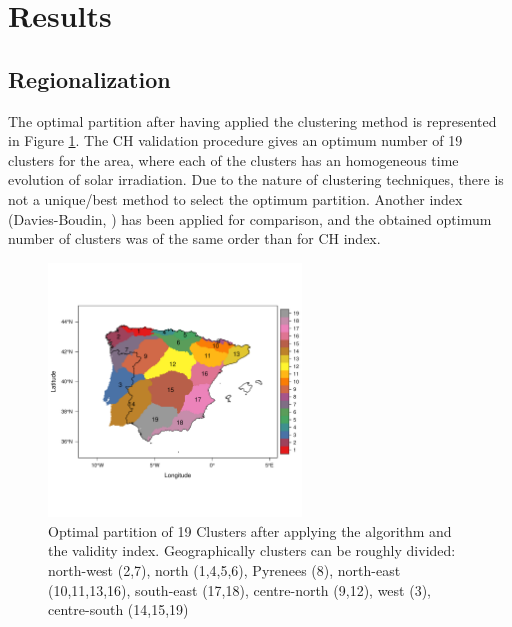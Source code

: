  

\section{Results}

\subsection{Regionalization}

The optimal partition after having applied the clustering method is represented in Figure \ref{clusters}. The CH validation procedure gives an optimum number of 19 clusters for the area, where each of the clusters has an homogeneous time evolution of solar irradiation. Due to the nature of clustering techniques, there is not a unique/best method to select the optimum partition. Another index (Davies-Boudin, \cite{davies1979cluster}) has been applied for comparison, and the obtained optimum number of clusters was of the same order than for CH index.
 
\begin{figure}[h!]
\centering\includegraphics[width=0.6\textwidth]{figs/capitulo5/clusters2}
\caption[Optimal partition of clusters over the Iberian Peninsula]{Optimal partition of 19 Clusters after applying the algorithm and the validity index. Geographically clusters can be roughly divided: north-west (2,7), north (1,4,5,6), Pyrenees (8), north-east (10,11,13,16), south-east (17,18), centre-north (9,12), west (3), centre-south (14,15,19)}
\label{clusters}
\end{figure}

